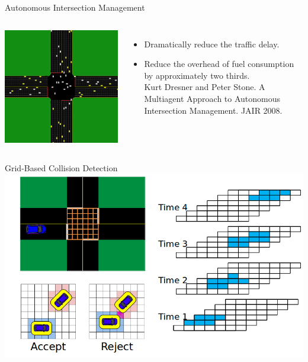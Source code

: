 \documentclass{beamer}
\begin{document}
\begin{frame}{Autonomous Intersection Management}
\begin{columns}[c]
		\includegraphics[width=\textwidth]{aim.png}
				
		\begin{itemize}
		\item Dramatically reduce the traffic delay.
		\item Reduce the overhead of fuel consumption by approximately
		two thirds.\\
		Kurt Dresner and Peter Stone. A Multiagent Approach to
		Autonomous Intersection Management. JAIR 2008.
		\end{itemize}
\end{columns}
\end{frame}

\begin{frame}{Grid-Based Collision Detection}
	\includegraphics[width=\textwidth]{grids.png}
\end{frame}
\end{document}

